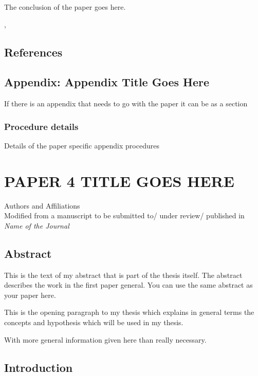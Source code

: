 \documentclass[
  12pt,
  notitlepage]{isuthesis}
\begin{document}
The conclusion of the paper goes here.

\cite{Rea85}
\cite{Enf87}, \cite{Dau75}
\cite{KPS75}

\section{References}
\printbibliography[heading=none, section=4]

\section{Appendix: Appendix Title Goes Here}

If there is an appendix that needs to go with the paper it can be as a section \cite{Aup91}

\subsection{Procedure details}

Details of the paper specific appendix procedures
\endrefsection

\chapter{PAPER 4 TITLE GOES HERE}

\begin{center}
    Authors and Affiliations \\
    Modified from a manuscript to be submitted to/ under review/ published in \textit{Name of the Journal} 
\end{center}

\section{Abstract}

This is the text of my abstract that is part of the thesis itself.
The abstract describes the work in the first paper general. You can use the same abstract as your paper here.

This is the opening paragraph to my thesis which
explains in general terms the concepts and hypothesis
which will be used in my thesis.

With more general information given here than really
necessary.

\section{Introduction}
\end{document}
